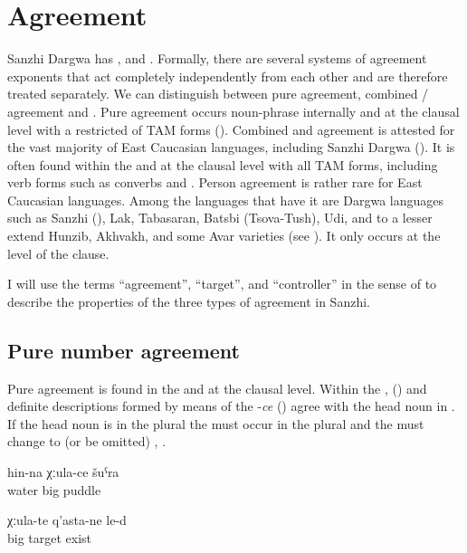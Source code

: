 \chapter{Agreement}
\label{cpt:Agreement}

Sanzhi Dargwa has ,  and . Formally, there are several systems of agreement exponents that act completely independently from each other and are therefore treated separately. We can distinguish between pure  agreement, combined / agreement and . Pure  agreement occurs noun-phrase internally and at the clausal level with a restricted  of TAM forms (). Combined  and  agreement is attested for the vast majority of East Caucasian languages, including Sanzhi Dargwa (). It is often found within the  and at the clausal level with all TAM forms, including verb forms such as converbs and . Person agreement is rather rare for East Caucasian languages. Among the languages that have it are Dargwa languages such as Sanzhi (), Lak, Tabasaran, Batsbi (Tsova-Tush), Udi, and to a lesser extend Hunzib, Akhvakh, and some Avar varieties (see \citealp{Helmbrecht1996, vandenBerg1999, Schulze2007}). It only occurs at the level of the clause.

I will use the terms ``agreement'', ``target'', and ``controller'' in the sense of \citealp{Corbett2006} to describe the properties of the three types of agreement in Sanzhi.



\section{Pure number agreement}
\label{sec:Pure number agreement}
Pure  agreement is found in the  and at the clausal level. Within the ,  () and definite descriptions formed by means of the  -\textit{ce} () agree with the head noun in . If the head noun is in the plural the  must occur in the plural and the  must change to  (or be omitted)  , .
%
\begin{exe}
	\ex	\label{ex:‎a big puddle of water}
	\gll	hin-na	χːula-ce	šuˁra\\
		water	big	puddle\\
	\glt	{}

	\ex	\label{ex:‎There are big targets}
	\gll	χːula-te	q'asta-ne	le-d\\
		big 	target	exist\\
	\glt	{}
\end{exe}

